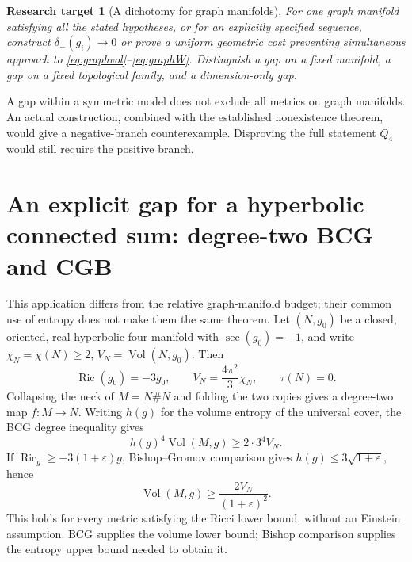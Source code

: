 \documentclass[a4paper,11pt]{article}
\numberwithin{equation}{section}
\newtheorem{target}[theorem]{Research target}
\theoremstyle{definition}
\newcommand{\Ric}{\operatorname{Ric}}
\newcommand{\Vol}{\operatorname{Vol}}
\begin{document}
\begin{target}[A dichotomy for graph manifolds]
For one graph manifold satisfying all the stated hypotheses, or for an explicitly specified sequence, construct $\delta_-(g_i)\to0$ or prove a uniform geometric cost preventing simultaneous approach to \eqref{eq:graphvol}--\eqref{eq:graphW}. Distinguish a gap on a fixed manifold, a gap on a fixed topological family, and a dimension-only gap.
\end{target}
A gap within a symmetric model does not exclude all metrics on graph manifolds. An actual construction, combined with the established nonexistence theorem, would give a negative-branch counterexample. Disproving the full statement $Q_4$ would still require the positive branch.

\section{An explicit gap for a hyperbolic connected sum: degree-two BCG and CGB}\label{sec:hyperbolic-double}
This application differs from the relative graph-manifold budget; their common use of entropy does not make them the same theorem.
Let $(N,g_0)$ be a closed, oriented, real-hyperbolic four-manifold with $\sec(g_0)=-1$, and write $\chi_N=\chi(N)\ge2$, $V_N=\Vol(N,g_0)$. Then
\[
 \Ric(g_0)=-3g_0,\qquad V_N=\frac{4\pi^2}{3}\chi_N,
 \qquad\tau(N)=0.
\]
Collapsing the neck of $M=N\#N$ and folding the two copies gives a degree-two map $f:M\to N$.
Writing $h(g)$ for the volume entropy of the universal cover, the BCG degree inequality gives
\[
 h(g)^4\Vol(M,g)\ge2\cdot3^4V_N.
\]
If $\Ric_g\ge-3(1+\varepsilon)g$, Bishop--Gromov comparison gives $h(g)\le3\sqrt{1+\varepsilon}$, hence
\begin{equation}\label{eq:bcg-lower}
 \Vol(M,g)\ge\frac{2V_N}{(1+\varepsilon)^2}.
\end{equation}
This holds for every metric satisfying the Ricci lower bound, without an Einstein assumption. BCG supplies the volume lower bound; Bishop comparison supplies the entropy upper bound needed to obtain it.
\end{document}

